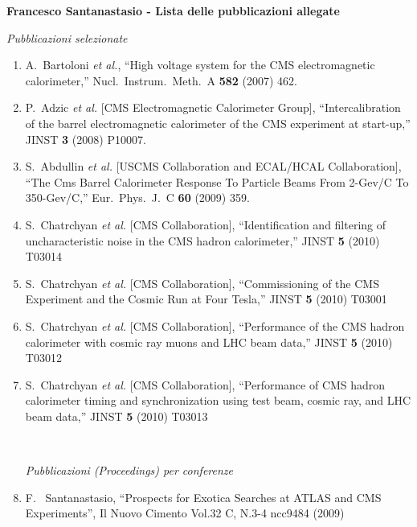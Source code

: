 \documentclass[10pt]{letter}
\begin{document}
{\large \sc \bf Francesco Santanastasio - Lista delle pubblicazioni allegate}



\begin{center} \textit{Pubblicazioni selezionate} \end{center}

\begin{enumerate}
\item A.~Bartoloni {\it et al.},
  ``High voltage system for the CMS electromagnetic calorimeter,''
  Nucl.\ Instrum.\ Meth.\  A {\bf 582} (2007) 462.
\item P.~Adzic {\it et al.}  [CMS Electromagnetic Calorimeter Group],
  ``Intercalibration of the barrel electromagnetic calorimeter of the CMS
  experiment at start-up,'' JINST {\bf 3} (2008) P10007.
\item S.~Abdullin {\it et al.}  [USCMS Collaboration and ECAL/HCAL Collaboration],
  ``The Cms Barrel Calorimeter Response To Particle Beams From 2-Gev/C To 350-Gev/C,''
  Eur.\ Phys.\ J.\  C {\bf 60} (2009) 359.
\item S.~Chatrchyan {\it et al.}  [CMS Collaboration],
  ``Identification and filtering of uncharacteristic noise in the CMS hadron calorimeter,''
  JINST {\bf 5} (2010) T03014
\item S.~Chatrchyan {\it et al.}  [CMS Collaboration],
  ``Commissioning of the CMS Experiment and the Cosmic Run at Four Tesla,''
  JINST {\bf 5} (2010) T03001
\item S.~Chatrchyan {\it et al.}  [CMS Collaboration],
  ``Performance of the CMS hadron calorimeter with cosmic ray muons and LHC beam data,''
  JINST {\bf 5} (2010) T03012
\item S.~Chatrchyan {\it et al.}  [CMS Collaboration],
  ``Performance of CMS hadron calorimeter timing and synchronization using test beam, cosmic ray, and LHC beam data,''
  JINST {\bf 5} (2010) T03013

~\\
\begin{center} \textit{Pubblicazioni (Proceedings) per conferenze} \\ 
\end{center}

\item F. ~Santanastasio, ``Prospects for Exotica Searches at ATLAS and CMS Experiments'', 
  Il Nuovo Cimento Vol.32 C, N.3-4 ncc9484 (2009)


\end{enumerate}
\end{document}

